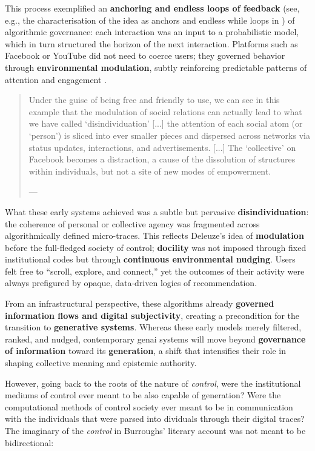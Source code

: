 This process exemplified an \textbf{anchoring and endless loops of feedback} (see, e.g., the characterisation of the idea as anchors and endless while loops in \cite[34--35]{demir2019}) of algorithmic governance: each interaction was an input to a probabilistic model, which in turn structured the horizon of the next interaction. Platforms such as Facebook or YouTube did not need to coerce users; they governed behavior through \textbf{environmental modulation}, subtly reinforcing predictable patterns of attention and engagement \parencite[29--32]{demir2019}.

\begin{quote}
	Under the guise of being free and friendly to use, we can see in this example that the modulation of social relations can actually lead to what we have called ‘disindividuation’ [...] the attention of each social atom (or ‘person’) is sliced into ever smaller pieces and dispersed across networks via status updates, interactions, and advertisements. [...] The ‘collective’ on Facebook becomes a distraction, a cause of the dissolution of structures within individuals, but not a site of new modes of empowerment.

	--- \cite[90]{hui2015}
\end{quote}

What these early systems achieved was a subtle but pervasive \textbf{disindividuation}: the coherence of personal or collective agency was fragmented across algorithmically defined micro-traces. This reflects Deleuze’s idea of \textbf{modulation} before the full-fledged society of control; \textbf{docility} was not imposed through fixed institutional codes but through \textbf{continuous environmental nudging}. Users felt free to “scroll, explore, and connect,” yet the outcomes of their activity were always prefigured by opaque, data-driven logics of recommendation.

From an infrastructural perspective, these algorithms already \textbf{governed information flows and digital subjectivity}, creating a precondition for the transition to \textbf{generative systems}. Whereas these early models merely filtered, ranked, and nudged, contemporary \gls{genai} systems will move beyond \textbf{governance of information} toward its \textbf{generation}, a shift that intensifies their role in shaping collective meaning and epistemic authority.

However, going back to the roots of the nature of
\textit{control}, were the
institutional mediums of control ever meant to be also capable of generation?
Were the computational methods of control society ever meant to be in
communication with the individuals that were parsed into dividuals through
their digital traces? The imaginary of the \textit{control} in Burroughs'
literary account was not meant to be bidirectional:


